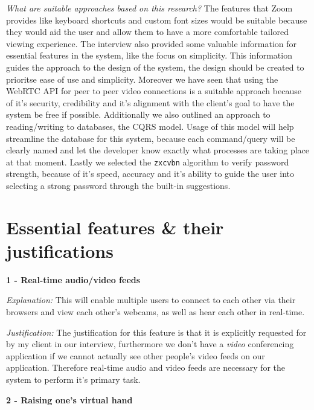 \textit{What are suitable approaches based on this research?}
The features that Zoom provides like keyboard shortcuts and 
custom font sizes would be suitable because they would aid the
user and allow them to have a more comfortable tailored 
viewing experience. The interview also provided some valuable 
information for essential features in the system, like the 
focus on simplicity. This information guides the approach to 
the design of the system, the design should be created to 
prioritse ease of use and simplicity. Moreover we have seen 
that using the WebRTC API for peer to peer video connections
is a suitable approach because of it's security, credibility
and it's alignment with the client's goal to have the system
be free if possible. Additionally we also outlined an 
approach to reading/writing to databases, the 
CQRS model. Usage of this model will help streamline the 
database for this system, because each command/query will be
clearly named and let the developer know exactly what 
processes are taking place at that moment. Lastly we selected
the \texttt{zxcvbn} algorithm to verify password strength, 
because of it's speed, accuracy and it's ability to guide the 
user into selecting a strong password through the built-in 
suggestions.

\section{Essential features \& their justifications}
\label{sec:features}

\textbf{1 - Real-time audio/video feeds} \\ \vspace{0.1cm}

\textit{Explanation:} This will enable multiple users to 
connect to each other via their browsers and view each 
other's webcams, as well as hear
each other in real-time. \vspace{0.1cm}

\textit{Justification:} The justification for this feature is
that it is explicitly requested for by my client in our
interview, furthermore we don't have a \textit{video}
conferencing application if we cannot actually see other 
people's video feeds on our application. Therefore real-time
audio and video feeds are necessary for the system to perform
it's primary task.

\vspace{0.2cm}

\textbf{2 - Raising one's virtual hand} \\ \vspace{0.1cm}

